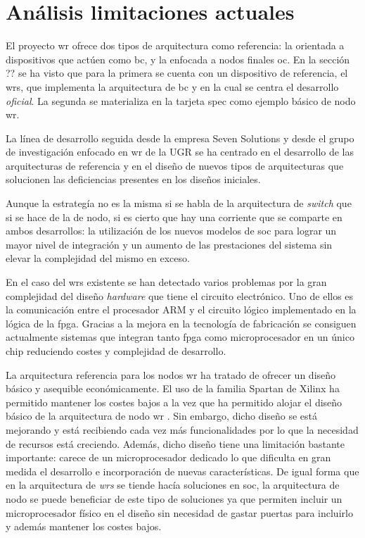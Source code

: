 \chapter{Análisis limitaciones actuales}


El proyecto \gls{wr} ofrece dos tipos de arquitectura como referencia: la 
orientada a dispositivos que actúen como \gls{bc}, y la enfocada a nodos 
finales \gls{oc}. En la sección ?? se ha visto que para la primera se cuenta 
con un dispositivo de referencia, el \gls{wrs}, que implementa la arquitectura 
de \gls{bc} y en la cual se centra el desarrollo \textit{oficial}. La segunda 
se materializa en la tarjeta \gls{spec} como ejemplo básico de nodo \gls{wr}.

La línea de desarrollo seguida desde la empresa Seven Solutions y desde el 
grupo de investigación enfocado en \gls{wr} de la UGR se ha centrado en el 
desarrollo de las arquitecturas de referencia y en el diseño de nuevos tipos de 
arquitecturas que solucionen las deficiencias presentes en los diseños 
iniciales.

Aunque la estrategía no es la misma si se habla de la arquitectura de 
\textit{switch} que si se hace de la de nodo, si es cierto que hay una 
corriente que se comparte en ambos desarrollos: la utilización de los nuevos 
modelos de \gls{soc} para lograr un mayor nivel de integración y un aumento de 
las prestaciones del sistema sin elevar la complejidad del mismo en exceso.

En el caso del \gls{wrs} existente se han detectado varios problemas por la 
gran complejidad del diseño \textit{hardware} que tiene el circuito 
electrónico. 
Uno de ellos es la comunicación entre el procesador ARM y el circuito lógico 
implementado en la lógica de la \gls{fpga}. Gracias a la mejora en la 
tecnología de fabricación se consiguen actualmente sistemas que integran tanto 
\gls{fpga} como microprocesador en un único chip reduciendo costes y 
complejidad de desarrollo.

La arquitectura referencia para los nodos \gls{wr} ha tratado de ofrecer un 
diseño básico y asequible económicamente. El uso de la familia Spartan de 
Xilinx ha permitido mantener los costes bajos a la vez que ha permitido alojar 
el diseño básico de la arquitectura de nodo \gls{wr} . Sin embargo, dicho 
diseño se está mejorando y está recibiendo cada vez más funcionalidades por lo 
que la necesidad de recursos está creciendo. Además, dicho diseño tiene una 
limitación bastante importante: carece de un microprocesador dedicado lo que 
dificulta en gran medida el desarrollo e incorporación de nuevas 
características. De igual forma que en la arquitectura de \textit{wrs} se 
tiende hacía soluciones en \gls{soc}, la arquitectura de nodo se puede 
beneficiar de este tipo de soluciones ya que permiten incluir un 
microprocesador físico en el diseño sin necesidad de gastar puertas para 
incluirlo y además mantener los costes bajos.

